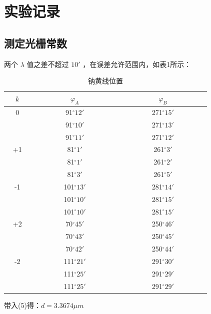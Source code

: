 \documentclass[a4paper,8pt,twocolumn]{article}
\begin{document}
\section{实验记录}
 \subsection{测定光栅常数}
  两个 $\lambda$ 值之差不超过 $10'$ ，在误差允许范围内，如表1所示：\\
  \begin{table}[h]
   \centering
   \begin{tabular}{|c|c|c|}
    \hline 
    ~~$k$~~ & ~~~~~~~~~$\varphi_A$~~~~~~~~~ & ~~~~~~~~~$\varphi_B$~~~~~~~~~ \\ 
    \hline 
    0 & 91$^\circ 12'$ & 271$^\circ 15'$ \\
      & 91$^\circ 10'$ & 271$^\circ 13'$ \\
      & 91$^\circ 11'$ & 271$^\circ 12'$ \\
    \hline
   +1 & 81$^\circ 1'$ & 261$^\circ 3'$ \\
      & 81$^\circ 1'$ & 261$^\circ 2'$ \\
      & 81$^\circ 3'$ & 261$^\circ 5'$ \\
    \hline
   -1 & 101$^\circ 13'$ & 281$^\circ 14'$ \\
      & 101$^\circ 10'$ & 281$^\circ 15'$ \\
      & 101$^\circ 10'$ & 281$^\circ 15'$ \\
    \hline
   +2 & 70$^\circ 45'$ & 250$^\circ 46'$ \\
      & 70$^\circ 43'$ & 250$^\circ 45'$ \\
      & 70$^\circ 42'$ & 250$^\circ 44'$ \\
    \hline
   -2 & 111$^\circ 21'$ & 291$^\circ 30'$ \\
      & 111$^\circ 25'$ & 291$^\circ 29'$ \\
      & 111$^\circ 25'$ & 291$^\circ 29'$ \\
    \hline 
   \end{tabular}
   \caption{钠黄线位置}
   \label{Date_1}
  \end{table}
 带入(5)得：$d = 3.3674 \mu m$
\end{document}
